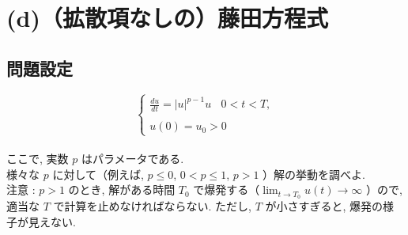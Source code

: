 \documentclass[11pt]{jsarticle}
\begin{document}
\clearpage
\section{(d)（拡散項なしの）藤田方程式}
\subsection{問題設定}
\[\left\{ 
\begin{array}{l}
\displaystyle \frac{du}{dt} = |u|^{p-1}u\ \ \ \ 0 < t < T, \\ \\
u(0) = u_{0} > 0
\end{array}
\right.\]
\\
ここで, 実数 $p$ はパラメータである. \\
様々な $p$ に対して（例えば, $p \leq 0$, $0 < p \leq 1$, $p > 1$ ）解の挙動を調べよ. \\
注意 : $p > 1$ のとき, 解がある時間 $T_{0}$ で爆発する（$ \lim_{t \to T_{0}}u(t) \rightarrow \infty$ ）ので, 適当な $T$ で計算を止めなければならない. ただし, $T$ が小さすぎると, 爆発の様子が見えない. 

\end{document}
